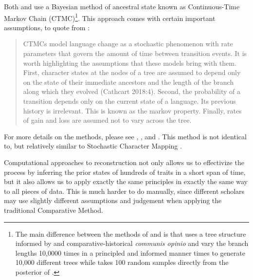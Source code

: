 \documentclass[a4paper,10pt]{article} %
\begin{document}
Both \citet{carling2021reconstructing} and \citet{goldstein_2022} use a Bayesian method of ancestral state known as Continuous-Time Markov Chain (CTMC)\footnote{The main difference between the methods of \citet{carling2021reconstructing} and \citet{chang2015ancestry} is that \citet{carling2021reconstructing} uses a tree structure informed by \citet{chang2015ancestry} and comparative-historical \emph{communis opinio} and vary the branch lengths 10,0000 times in a principled and informed manner times to generate 10,000 different trees while \citet{goldstein_2022} takes 100 random samples directly from the posterior of \citet{chang2015ancestry}.}. This approach comes with certain important assumptions, to quote from \citet{goldstein_2022}:

\begin{quotation}
CTMCs model language change as a stochastic phenomenon with rate parameters that govern the amount of time between transition events. It is worth highlighting the assumptions that these models bring with them. First, character states at the nodes of a tree are assumed to depend only on the state of their immediate ancestors and the length of the branch along which they evolved (Cathcart 2018:4). Second, the probability of a transition depends only on the current state of a language. Its previous history is irrelevant. This is known as the markov property. Finally, rates of gain and loss are assumed not to vary across the tree.
\end{quotation}

For more details on the methods, please see  \citet{goldstein_2022}, \citet{pagel2004bayesian}, \citet{ronquist2004bayesian} and \citet{liggett2010continuous}. This method is not identical to, but relatively similar to Stochastic Character Mapping \citep{huelsenbeck2003stochastic}.

Computational approaches to reconstruction not only allows us to effectivize the process by inferring the prior states of hundreds of traits in a short span of time, but it also allows us to apply exactly the same principles in exactly the same way to all pieces of data. This is much harder to do manually, since different scholars may use slightly different assumptions and judgement when applying the traditional Comparative Method. 
\end{document}
